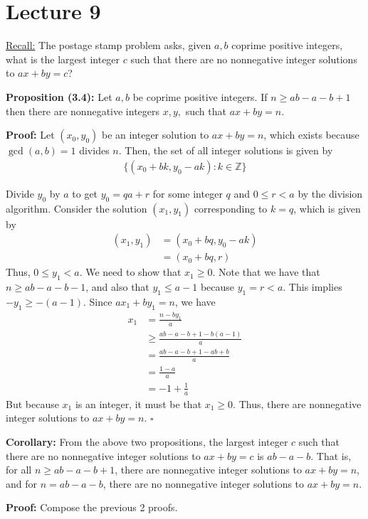 \documentclass{article}
\newcommand*{\qed}{\hfill$\square$}%
\newcommand*{\zz}{\mathbb{Z}}%
\begin{document}
\section{Lecture 9}

\underline{Recall:} The postage stamp problem asks, given $a,b$ coprime positive integers, what is the largest integer $c$ such that there are no nonnegative integer solutions to $ax+by=c$?

\textbf{Proposition (3.4):} Let $a,b$ be coprime positive integers. If $n\geq ab-a-b+1$ then there are nonnegative integers $x,y,$ such that $ax+by=n$.

\textbf{Proof:} Let $(x_0,y_0)$ be an integer solution to $ax+by=n$, which exists because $\gcd(a,b)=1$ divides $n$. Then, the set of all integer solutions is given by \begin{align*}
    \{ (x_0 + bk, y_0 - ak) : k\in \zz \}
\end{align*}

Divide $y_0$ by $a$ to get $y_0=qa+r$ for some integer $q$ and $0\leq r<a$ by the division algorithm. Consider the solution $(x_1,y_1)$ corresponding to $k=q$, which is given by \begin{align*}
    (x_1,y_1) &= (x_0 + bq, y_0 - ak) \\
             &= (x_0 + bq, r)
\end{align*}Thus, $0\leq y_1<a$. We need to show that $x_1\geq 0$. Note that we have that $n\geq ab-a-b-1$, and also that $y_1\leq a-1$ because $y_1=r<a$. This implies $-y_1\geq -(a-1)$. Since $ax_1+by_1=n$, we have \begin{align*}
    x_1&=\frac{n-by_1}{a} \\
       &\geq \frac{ab-a-b+1 - b(a-1)}{a} \\
       &= \frac{ab-a-b+1 - ab + b}{a} \\
       &= \frac{1-a}{a} \\
       &= -1 + \frac{1}{a}
\end{align*}But because $x_1$ is an integer, it must be that $x_1\geq 0$. Thus, there are nonnegative integer solutions to $ax+by=n$. \qed

\textbf{Corollary:} From the above two propositions, the largest integer $c$ such that there are no nonnegative integer solutions to $ax+by=c$ is $ab-a-b$. That is, for all $n\geq ab-a-b+1$, there are nonnegative integer solutions to $ax+by=n$, and for $n=ab-a-b$, there are no nonnegative integer solutions to $ax+by=n$. 

\textbf{Proof:} Compose the previous 2 proofs.
\end{document}
